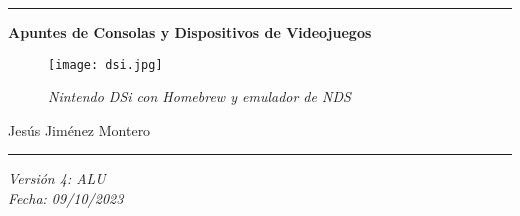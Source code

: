 \documentclass[12pt]{article}
\date{}
\begin{document}
\nocite{atkinson}
\nocite{circuitverse}
\nocite{chatgpt}
\nocite{duke}
\begin{titlepage}
        \begin{center}
             
         
        \hrule
        \vspace{1cm}
        \vspace{1cm}
        {\bfseries\huge Apuntes de Consolas y Dispositivos de Videojuegos \par}
        \vspace{2cm}

        \begin{figure}[H]
            \centering
            \texttt{[image: dsi.jpg]}
            \caption*{\footnotesize{\textit{Nintendo DSi con Homebrew y emulador de NDS}}}
            \label{fig:dsi}
        \end{figure}
        
        {\large 
        Jesús Jiménez Montero \\
        \par}
        \vspace{1cm}
        \hrule
        \vspace{1cm}

        {\large 
        \textit{Versión 4: ALU\\
        Fecha: 09/10/2023}
        \par}
        \end{center}
\end{titlepage}

\newpage
\renewcommand{\contentsname}{Tabla de contenidos}
\setcounter{secnumdepth}{5}
\tableofcontents
\setcounter{tocdepth}{4}

\newpage
\newpage
\renewcommand{\listfigurename}{Lista de figuras}
\thispagestyle{empty}
\listoffigures
\newpage

\renewcommand{\listtablename}{Lista de tablas}
\listoftables
\newpage


\end{document}

